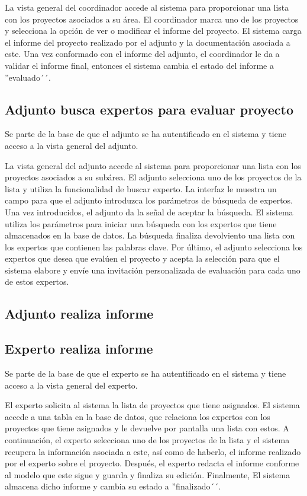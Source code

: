 \documentclass[11pt,a4paper,spanish,twoside]{book}
\begin{document}
La vista general del coordinador accede al sistema para proporcionar una
lista con los proyectos asociados a su área. El coordinador marca uno
de los proyectos y selecciona la opción de ver o modificar el informe del
proyecto. El sistema carga el informe del proyecto realizado por el adjunto
y la documentación asociada a este. Una vez conformado con el informe del
adjunto, el coordinador le da a validar el informe final, entonces el sistema
cambia el estado del informe a ''evaluado´´.

\subsection{Adjunto busca expertos para evaluar proyecto}
Se parte de la base de que el adjunto se ha autentificado en el sistema y
tiene acceso a la vista general del adjunto.

La vista general del adjunto accede al sistema para proporcionar una lista
con los proyectos asociados a su subárea. El adjunto selecciona uno de los
proyectos de la lista y utiliza la funcionalidad de buscar experto. La 
interfaz le muestra un campo para que el adjunto introduzca los parámetros de
búsqueda de expertos. Una vez introducidos, el adjunto da la señal de
aceptar la búsqueda. El sistema utiliza los parámetros para iniciar una 
búsqueda con los expertos que tiene almacenados en la base de datos. La
búsqueda finaliza devolviento una lista con los expertos que contienen las
palabras clave. Por último, el adjunto selecciona los expertos que desea que
evalúen el proyecto y acepta la selección para que el sistema elabore y
envíe una invitación personalizada de evaluación para cada uno de estos
expertos.

\subsection{Adjunto realiza informe}

\subsection{Experto realiza informe}
Se parte de la base de que el experto se ha autentificado en el sistema y
tiene acceso a la vista general del experto.

El experto solicita al sistema la lista de proyectos que tiene asignados. El
sistema accede a una tabla en la base de datos, que relaciona los expertos con
los proyectos que tiene asignados y le devuelve por pantalla una lista con 
estos. A continuación, el experto selecciona uno de los proyectos de la lista
y el sistema recupera la información asociada a este, así como de haberlo, el
informe realizado por el experto sobre el proyecto. Después, el experto
redacta el informe conforme al modelo que este sigue y guarda y finaliza su
edición. Finalmente, El sistema almacena dicho informe y cambia su estado a
''finalizado´´.
\end{document}
